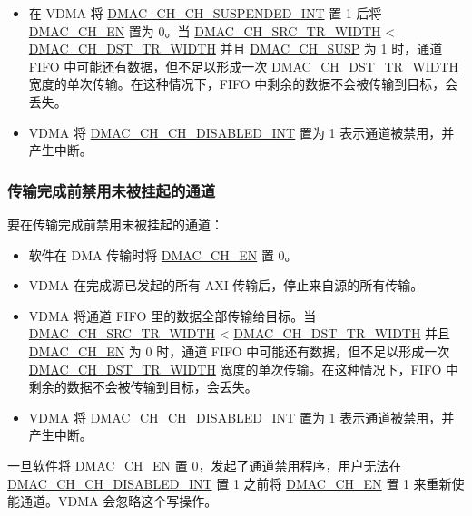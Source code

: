 \documentclass[main\_\_CN.tex]{subfiles}
\begin{document}
\begin{itemize}
    \item 在 VDMA 将 \hyperref[int:DMACCHNCHSUSPENDEDINT]{DMAC\_CH\_CH\_SUSPENDED\_INT} 置 1 后将 \hyperref[fielddesc:DMACCH1EN]{DMAC\_CH\_EN} 置为 0。当 \hyperref[fielddesc:DMACCHNSRCTRWIDTH]{DMAC\_CH\_SRC\_TR\_WIDTH} < \hyperref[fielddesc:DMACCHNDSTTRWIDTH]{DMAC\_CH\_DST\_TR\_WIDTH} 并且 \hyperref[fielddesc:DMACCH1SUSP]{DMAC\_CH\_SUSP} 为 1 时，通道 FIFO 中可能还有数据，但不足以形成一次 \hyperref[fielddesc:DMACCHNDSTTRWIDTH]{DMAC\_CH\_DST\_TR\_WIDTH} 宽度的单次传输。在这种情况下，FIFO 中剩余的数据不会被传输到目标，会丢失。

    \item VDMA 将 \hyperref[int:DMACCHNCHDISABLEDINT]{DMAC\_CH\_CH\_DISABLED\_INT} 置为 1 表示通道被禁用，并产生中断。

\end{itemize}

\subsubsection{传输完成前禁用未被挂起的通道}

要在传输完成前禁用未被挂起的通道：

\begin{itemize}
    \item 软件在 DMA 传输时将 \hyperref[fielddesc:DMACCH1EN]{DMAC\_CH\_EN} 置 0。
    \item VDMA 在完成源已发起的所有 AXI 传输后，停止来自源的所有传输。
    \item VDMA 将通道 FIFO 里的数据全部传输给目标。当 \hyperref[fielddesc:DMACCHNSRCTRWIDTH]{DMAC\_CH\_SRC\_TR\_WIDTH} < \hyperref[fielddesc:DMACCHNDSTTRWIDTH]{DMAC\_CH\_DST\_TR\_WIDTH} 并且 \hyperref[fielddesc:DMACCH1EN]{DMAC\_CH\_EN} 为 0 时，通道 FIFO 中可能还有数据，但不足以形成一次 \hyperref[fielddesc:DMACCHNDSTTRWIDTH]{DMAC\_CH\_DST\_TR\_WIDTH} 宽度的单次传输。在这种情况下，FIFO 中剩余的数据不会被传输到目标，会丢失。
    \item VDMA 将 \hyperref[int:DMACCHNCHDISABLEDINT]{DMAC\_CH\_CH\_DISABLED\_INT} 置为 1 表示通道被禁用，并产生中断。

\end{itemize}

\begin{tiplisting}
    一旦软件将 \hyperref[fielddesc:DMACCH1EN]{DMAC\_CH\_EN} 置 0，发起了通道禁用程序，用户无法在 \hyperref[int:DMACCHNCHDISABLEDINT]{DMAC\_CH\_CH\_DISABLED\_INT} 置 1 之前将 \hyperref[fielddesc:DMACCH1EN]{DMAC\_CH\_EN} 置 1 来重新使能通道。VDMA 会忽略这个写操作。
\end{tiplisting}
\end{document}
